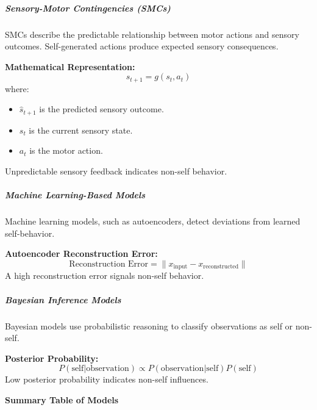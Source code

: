 \documentclass{book}
\providecommand{\ProjectDeepHeading}[2]{%
    \par\medskip\noindent\textbf{#2}\par\smallskip
}
\begin{document}
\subparagraph{Sensory-Motor Contingencies (SMCs)}
SMCs describe the predictable relationship between motor actions and sensory outcomes. Self-generated actions produce expected sensory consequences.

\textbf{Mathematical Representation:}
\begin{equation}
    \hat{s}_{t+1} = g(s_t, a_t)
\end{equation}
where:
\begin{itemize}
    \item \( \hat{s}_{t+1} \) is the predicted sensory outcome.
    \item \( s_t \) is the current sensory state.
    \item \( a_t \) is the motor action.
\end{itemize}
Unpredictable sensory feedback indicates non-self behavior.

\subparagraph{Machine Learning-Based Models}
Machine learning models, such as autoencoders, detect deviations from learned self-behavior.

\textbf{Autoencoder Reconstruction Error:}
\begin{equation}
    \text{Reconstruction Error} = \| x_{\text{input}} - x_{\text{reconstructed}} \|
\end{equation}
A high reconstruction error signals non-self behavior.

\subparagraph{Bayesian Inference Models}
Bayesian models use probabilistic reasoning to classify observations as self or non-self.

\textbf{Posterior Probability:}
\begin{equation}
    P(\text{self} | \text{observation}) \propto P(\text{observation} | \text{self}) P(\text{self})
\end{equation}
Low posterior probability indicates non-self influences.

\ProjectDeepHeading{1}{Summary Table of Models}
\end{document}
